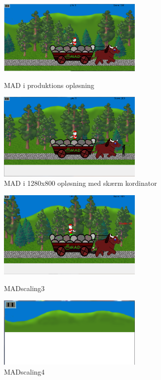 \documentclass[Main.tex]{TeksturSkalering}
\begin{document}


\lstset{numbers=left, language=[Sharp]C}



\begin{figure}[h]
\centering
\parbox{7cm}{   
\includegraphics[width = 7cm]{billeder/MADscaling1}
\caption{MAD i produktions opløsning}    
\label{MADscaling1}}
\qquad
\begin{minipage}{7cm}
\includegraphics[width = 7cm]{billeder/MADscaling2}
\caption{MAD i 1280x800 opløsning med skærm kordinator}    
\label{MADscaling2}
\end{minipage}
\end{figure}

\begin{figure}[h]
\centering
\parbox{7cm}{   
\includegraphics[width = 7cm]{billeder/MADscaling3}
\caption{MADscaling3}    
\label{MADscaling3}}
\qquad
\begin{minipage}{7cm}
\includegraphics[width = 7cm]{billeder/MADscaling4}
\caption{MADscaling4}    
\label{MADscaling4}
\end{minipage}
\end{figure}
\end{document}
